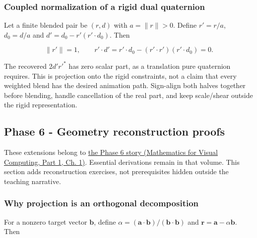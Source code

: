\subsubsection{Coupled normalization of a rigid dual quaternion}\label{02-foundations-ii-ch039-coupled-normalization-of-a-rigid-dual-quaternion}

\hypertarget{02-foundations-ii-ch039-coupled-normalization-of-a-rigid-dual-quaternion}{}

Let a finite blended pair be \((r,d)\) with \(a=\|r\|>0\). Define \(r'=r/a\), \(d_0=d/a\) and \(d'=d_0-r'(r'\cdot d_0)\). Then

\[
\|r'\|=1,\qquad r'\cdot d'=r'\cdot d_0-(r'\cdot r')(r'\cdot d_0)=0.
\]

The recovered \(2d'r'^*\) has zero scalar part, as a translation pure quaternion requires. This is projection onto the rigid constraints, not a claim that every weighted blend has the desired animation path. Sign-align both halves together before blending, handle cancellation of the real part, and keep scale/shear outside the rigid representation.

\subsection{Phase 6 - Geometry reconstruction proofs}\label{02-foundations-ii-ch039-phase-6---geometry-reconstruction-proofs}

\hypertarget{02-foundations-ii-ch039-phase-6---geometry-reconstruction-proofs}{}

These extensions belong to \href{../02-Mathematics-for-Visual-Computing-P01/main.pdf\#01-foundations-i-ch017-the-panel-gives-us-a-reason-to-learn}{the Phase 6 story (Mathematics for Visual Computing, Part 1, Ch. 1)}. Essential derivations remain in that volume. This section adds reconstruction exercises, not prerequisites hidden outside the teaching narrative.

\subsubsection{Why projection is an orthogonal decomposition}\label{02-foundations-ii-ch039-why-projection-is-an-orthogonal-decomposition}

\hypertarget{02-foundations-ii-ch039-why-projection-is-an-orthogonal-decomposition}{}

For a nonzero target vector \(\mathbf b\), define \(\alpha=(\mathbf a\cdot\mathbf b)/(\mathbf b\cdot\mathbf b)\) and \(\mathbf r=\mathbf a-\alpha\mathbf b\). Then

